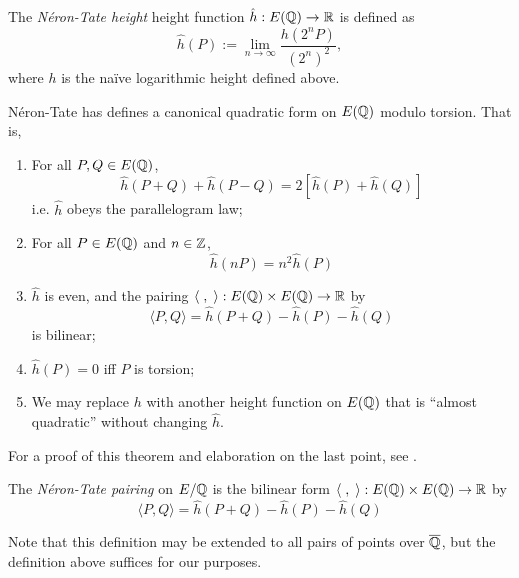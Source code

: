 \documentclass[10pt]{article}
\begin{document}
\begin{definition}
The {\it N\'eron-Tate height} height function $\hat{h}: E(\mathbb{Q}) \to \mathbb{R}$ is defined as
\begin{equation}
	\hat{h}(P) := \lim_{n \to \infty} \frac{h(2^n P)}{(2^n)^2},
\end{equation}
where $h$ is the na\"ive logarithmic height defined above.
\end{definition}

\begin{theorem}
N\'eron-Tate has defines a canonical quadratic form on $E(\mathbb{Q})$ modulo torsion. That is,
\begin{enumerate}
	\item For all $P,Q \in E(\mathbb{Q})$,
	\begin{equation}
		\hat{h}(P+Q) + \hat{h}(P-Q) = 2\left[ \hat{h}(P) + \hat{h}(Q)\right]
	\end{equation}
	i.e. $\hat{h}$ obeys the parallelogram law;
	\item For all $P \in E(\mathbb{Q})$ and $n \in \mathbb{Z}$,
	\begin{equation}
		\hat{h}(nP) = n^2 \hat{h}(P)
	\end{equation}
	\item $\hat{h}$ is even, and the pairing $\langle\;,\;\rangle: E(\mathbb{Q})\times E(\mathbb{Q}) \to \mathbb{R}$ by
	\begin{equation}
		\langle P,Q \rangle = \hat{h}(P+Q) - \hat{h}(P) - \hat{h}(Q)
	\end{equation}
	is bilinear;
	\item $\hat{h}(P) = 0$ iff $P$ is torsion;
	\item We may replace $h$ with another height function on $E(\mathbb{Q})$ that is ``almost quadratic'' without changing $\hat{h}$.
\end{enumerate}
\end{theorem}

For a proof of this theorem and elaboration on the last point, see \cite[pp. 227-232]{Sil-1985}.

\begin{definition}
The {\it N\'eron-Tate pairing} on $E/\mathbb{Q}$ is the bilinear form $\langle\;,\;\rangle: E(\mathbb{Q})\times E(\mathbb{Q}) \to \mathbb{R}$ by
	\begin{equation}
		\langle P,Q \rangle = \hat{h}(P+Q) - \hat{h}(P) - \hat{h}(Q)
	\end{equation}
\end{definition}
Note that this definition may be extended to all pairs of points over $\overline{\mathbb{Q}}$, but the definition above suffices for our purposes. \\
\end{document}
